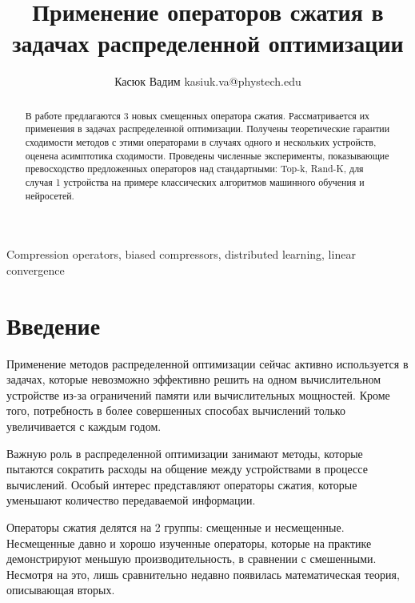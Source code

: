 \documentclass[12pt, twoside]{article}
\begin{document}
\title{Применение операторов сжатия в задачах распределенной оптимизации}

\author{\name Касюк Вадим  \email kasiuk.va@phystech.edu\\}

\maketitle

\begin{abstract}%

В работе предлагаются 3 новых смещенных оператора сжатия. Рассматривается их применения в задачах распределенной оптимизации. Получены теоретические гарантии сходимости методов с этими операторами в случаях одного и нескольких устройств, оценена асимптотика сходимости. Проведены численные эксперименты, показывающие превосходство предложенных операторов над стандартными: Top-k, Rand-K, для случая 1 устройства на примере классических алгоритмов машинного обучения и нейросетей.

\end{abstract}

\begin{keywords}
  Compression operators, biased compressors, distributed learning, linear convergence
\end{keywords}


\section{Введение}
Применение методов распределенной оптимизации сейчас активно используется в задачах, которые невозможно эффективно решить на одном вычислительном устройстве из-за ограничений памяти или вычислительных мощностей. Кроме того, потребность в более совершенных способах вычислений только увеличивается с каждым годом.

Важную роль в распределенной оптимизации занимают методы, которые пытаются сократить расходы на общение между устройствами в процессе вычислений. Особый интерес представляют операторы сжатия, которые уменьшают количество передаваемой информации. 

Операторы сжатия делятся на 2 группы: смещенные и несмещенные. Несмещенные давно и хорошо изученные операторы, которые на практике демонстрируют меньшую производительность, в сравнении с смешенными. Несмотря на это, лишь сравнительно недавно появилась математическая теория, описывающая вторых. 
\end{document}
